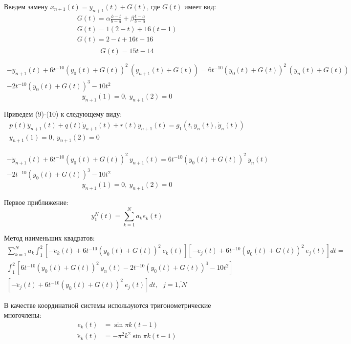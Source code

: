\documentclass[12pt]{article}
\begin{document}
Введем замену $x_{n+1}(t) = y_{n+1}(t) + G(t)$, где $G(t)$ имеет вид:
\begin{gather*}
	G(t) = \alpha \frac{b-t}{b-a} + \beta \frac{t-a}{b-a} \\
	G(t) = 1 (2-t) + 16 (t-1) \\
	G(t) = 2-t + 16t-16 \\
\end{gather*}
\begin{equation}
	G(t) = 15t - 14
\end{equation}

\begin{multline}
    -\ddot{y}_{n+1}(t) + 6t^{-10}(y_0(t) + G(t))^2\ (y_{n+1}(t) + G(t)) =
     6t^{-10}(y_0(t) + G(t))^2\ (y_n(t) + G(t)) \\
     - 2t^{-10}(y_0(t) + G(t))^3 - 10t^2
\end{multline}
\begin{equation}
    y_{n+1}(1)=0,\ y_{n+1}(2)=0
\end{equation}

Приведем (9)-(10) к следующему виду:
\begin{gather}
    p(t)\ddot{y}_{n+1}(t) + q(t)\dot{y}_{n+1}(t) + r(t)y_{n+1}(t) = g_1(t, y_n(t), \dot{y}_n(t)) \\
    y_{n+1}(1) = 0,\ y_{n+1}(2) = 0
\end{gather}

\begin{multline}
    -\ddot{y}_{n+1}(t) + 6t^{-10}(y_0(t) + G(t))^2\ y_{n+1}(t) =
    6t^{-10}(y_0(t) + G(t))^2\ y_n(t) \\
    - 2t^{-10}(y_0(t) + G(t))^3 - 10t^2
\end{multline}
\begin{equation}
    y_{n+1}(1) = 0,\ y_{n+1}(2) = 0
\end{equation}

Первое приближение:
\begin{equation}
    y_1^N(t) = \sum_{k = 1}^{N}a_ke_k(t)
\end{equation}

Метод наименьших квадратов:
\begin{multline}
    \sum_{k = 1}^{N}a_k \int_1^2 [-\ddot{e}_k(t) + 6t^{-10}(y_0(t) + G(t))^2\ e_k(t)]
    [-\ddot{e}_j(t) + 6t^{-10}(y_0(t) + G(t))^2\ e_j(t)]dt = \\
    \int_1^2[6t^{-10}(y_0(t)+G(t))^2\ y_n(t) - 2t^{-10}(y_0(t)+G(t))^3 - 10t^2]\\
    [-\ddot{e}_j(t) + 6t^{-10}(y_0(t) + G(t))^2\ e_j(t)]dt,\ \ \
    j = \overline{1,N}
\end{multline}

В качестве координатной системы используются тригонометрические многочлены:
\begin{equation}
    \begin{split}
        e_k(t) &= \sin{\pi k (t - 1)} \\
        \ddot{e}_k(t)&= -\pi^2 k^2\sin{\pi k(t-1)}
    \end{split}
\end{equation}
\end{document}
